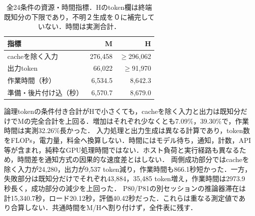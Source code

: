 \begin{table}[tb]
\centering\small\setlength{\tabcolsep}{3pt}
\caption{全24条件の資源・時間指標．Hのtoken欄は終端既知分の下限であり，不明２生成を０に補完していない．時間は実測合計．}
\begin{tabular}{lrr}
指標 & M & H \\ \hline
cacheを除く入力 & 276,458 & $\geq$296,062 \\
出力token & 66,022 & $\geq$91,970 \\
作業時間（秒） & 6,534.5 & 8,642.3 \\
準備・後片付け込（秒） & 6,570.7 & 8,679.0 \\
\hline
\end{tabular}
\end{table}
論理tokenの条件付き合計がHで小さくても，cacheを除く入力と出力は既知分だけでMの完全合計を上回る．増加はそれぞれ少なくとも7.09\%，39.30\%で，作業時間は実測32.26\%長かった．
入力処理と出力生成は異なる計算であり，token数をFLOPs，電力量，料金へ換算しない．時間にはモデル待ち，通知，計数，API等が含まれ，純粋なGPU処理時間ではない．ホスト負荷と実行経路も異なるため，時間差を通知方式の因果的な速度差とはしない．
両側成功部分ではcacheを除く入力が24,280，出力が9,537 token減り，作業時間も866.1秒短かった．一方，失敗部分は既知分だけでそれぞれ43,884，35,485 token増え，作業時間は2973.9秒長く，成功部分の減少を上回った．
P80/P81の別セッションの推論器滞在は計15,340.7秒，ロード20.12秒，評価40.42秒だった．これらは重なる測定値であり合算しない．共通時間をM/Hへ割り付けず，全件表に残す．
